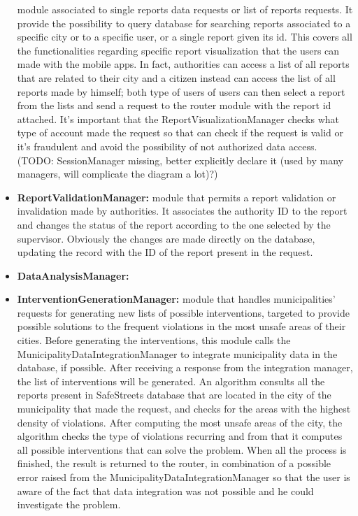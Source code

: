 \begin{itemize}
	module associated to single reports data requests or list of reports requests. It provide the possibility to query database for searching reports associated to a specific city or to a specific user, or a single report given its id. This covers all the functionalities regarding specific report visualization that the users can made with the mobile apps. In fact, authorities can access a list of all reports that are related to their city and a citizen instead can access the list of all reports made by himself; both type of users of users can then select a report from the lists and send a request to the router module with the report id attached. It's important that the ReportVisualizationManager checks what type of account made the request so that can check if the request is valid or it's fraudulent and avoid the possibility of not authorized data access. (TODO: SessionManager missing, better explicitly declare it (used by many managers, will complicate the diagram a lot)?)  
	\item \textbf{ReportValidationManager:}
	module that permits a report validation or invalidation made by authorities. It associates the authority ID to the report and changes the status of the report according to the one selected by the supervisor. Obviously the changes are made directly on the database, updating the record with the ID of the report present in the request.
	\item \textbf{DataAnalysisManager:}
	\item \textbf{InterventionGenerationManager:}
	module that handles municipalities' requests for generating new lists of possible interventions, targeted to provide possible solutions to the frequent violations in the most unsafe areas of their cities. Before generating the interventions, this module calls the MunicipalityDataIntegrationManager to integrate municipality data in the database, if possible. After receiving a response from the integration manager, the list of interventions will be generated. An algorithm consults all the reports present in SafeStreets database that are located in the city of the municipality that made the request, and checks for the areas with the highest density of violations. After computing the most unsafe areas of the city, the algorithm checks the type of violations recurring and from that it computes all possible interventions that can solve the problem. When all the process is finished, the result is returned to the router, in combination of a possible error raised from the MunicipalityDataIntegrationManager so that the user is aware of the fact that data integration was not possible and he could investigate the problem.

\end{itemize}
